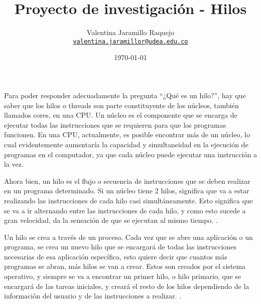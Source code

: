 \documentclass[12pt]{article}
\title{Proyecto de investigación - Hilos
}
\author{Valentina Jaramillo Raquejo\\%
    \href{mailto:valentina.jaramillor@udea.edu.co}{\texttt{valentina.jaramillor@udea.edu.co}} %
    }
\date{\today}
\begin{document}
{
\maketitle


Para poder responder adecuadamente la pregunta “¿Qué es un hilo?”, hay que saber que los hilos o threads son parte constituyente de los núcleos, también llamados cores, en una CPU. Un núcleo es el componente que se encarga de ejecutar todas las instrucciones que se requieren para que los programas funcionen. En una CPU, actualmente, es posible encontrar más de un núcleo, lo cual evidentemente aumentaría la capacidad y simultaneidad en la ejecución de programas en el computador, ya que cada núcleo puede ejecutar una instrucción a la vez. 
\newline

Ahora bien, un hilo es el flujo o secuencia de instrucciones que se deben realizar en un programa determinado. Si un núcleo tiene 2 hilos, significa que va a estar realizando las instrucciones de cada hilo casi simultáneamente. Esto significa que se va a ir alternando entre las instrucciones de cada hilo, y como esto sucede a gran velocidad, da la sensación de que se ejecutan al mismo tiempo. \citep{Defini}.
\newline

Un hilo se crea a través de un proceso. Cada vez que se abre una aplicación o un programa, se crea un nuevo hilo que se encargará de todas las instrucciones necesarias de esa aplicación específica, esto quiere decir que cuantos más programas se abran, más hilos se van a crear. Estos son creados por el sistema operativo, y siempre se va a encontrar un primer hilo, o hilo primario, que se encargará de las tareas iniciales, y creará el resto de los hilos dependiendo de la información del usuario y de las instrucciones a realizar. \citep{Hist}.
\newline

}
\end{document}
